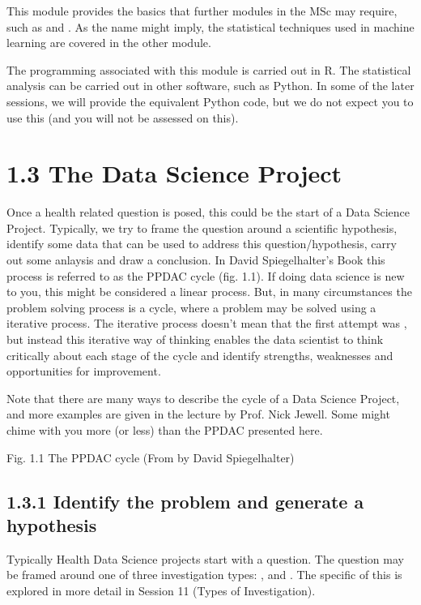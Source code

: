 \documentclass[letterpaper,10pt,english]{jupyterBook}
\begin{document}
\sphinxAtStartPar
This module provides the basics that further modules in the MSc may require, such as  and . As the name might imply, the statistical techniques used in machine learning are covered in the other module.

\sphinxAtStartPar
The programming associated with this module is carried out in R. The statistical analysis can be carried out in other software, such as Python. In some of the later sessions, we will provide the equivalent Python code, but we do not expect you to use this (and you will not be assessed on this).


\section{1.3 The Data Science Project}
\label{\detokenize{01. Introduction:the-data-science-project}}
\sphinxAtStartPar
Once a health related question is posed, this could be the start of a Data Science Project. Typically, we try to frame the question around a scientific hypothesis, identify some data that can be used to address this question/hypothesis, carry out some anlaysis and draw a conclusion. In David Spiegelhalter’s Book  this process is referred to as the PPDAC cycle (fig. 1.1). If doing data science is new to you, this might be considered a linear process. But, in many circumstances the problem solving process is a cycle, where a problem may be solved using a iterative process. The iterative process doesn’t mean that the first attempt was , but instead this iterative way of thinking enables the data scientist to think critically about each stage of the cycle and identify strengths, weaknesses and opportunities for improvement.

\sphinxAtStartPar
Note that there are many ways to describe the cycle of a Data Science Project, and more examples are given in the lecture by Prof. Nick Jewell. Some might chime with you more (or less) than the PPDAC presented here.

\sphinxAtStartPar
{}

\sphinxAtStartPar
 Fig. 1.1 The PPDAC cycle (From  by David Spiegelhalter) 


\subsection{1.3.1 Identify the problem and generate a hypothesis}
\label{\detokenize{01. Introduction:identify-the-problem-and-generate-a-hypothesis}}
\sphinxAtStartPar
Typically Health Data Science projects start with a question. The question may be framed around one of three investigation types: ,  and . The specific of this is explored in more detail in Session 11 (Types of Investigation).
\end{document}
